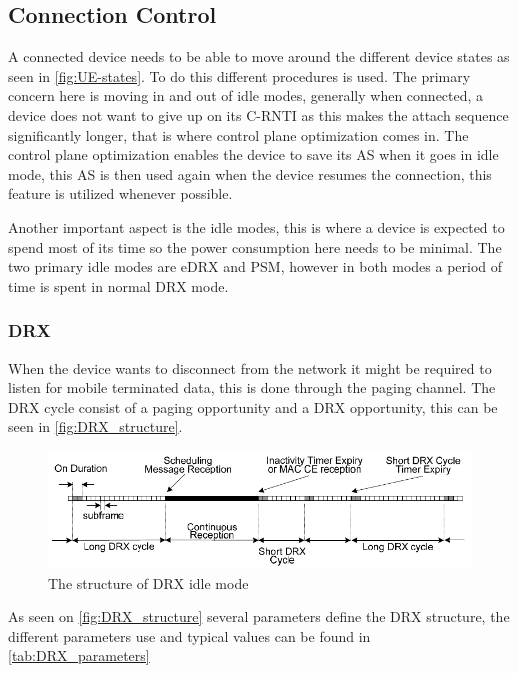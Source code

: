 \subsection{Connection Control}
A connected device needs to be able to move around the different device states as seen in \autoref{fig:UE-states}. To do this different procedures is used. The primary concern here is moving in and out of idle modes, generally when connected, a device does not want to give up on its \gls{C-RNTI} as this makes the attach sequence significantly longer, that is where control plane optimization comes in. The control plane optimization enables the device to save its \gls{AS} when it goes in idle mode, this \gls{AS} is then used again when the device resumes the connection, this feature is utilized whenever possible. 

Another important aspect is the idle modes, this is where a device is expected to spend most of its time so the power consumption here needs to be minimal. The two primary idle modes are \gls{eDRX} and \gls{PSM}, however in both modes a period of time is spent in normal DRX mode. 


\subsubsection{DRX}
When the device wants to disconnect from the network it might be required to listen for mobile terminated data, this is done through the paging channel. The DRX cycle consist of a paging opportunity and a DRX opportunity, this can be seen in \autoref{fig:DRX_structure}. 

\begin{figure}[H]
\centering
\includegraphics[width=\textwidth]{figures/DRX_structure.pdf}
\caption{The structure of \gls{DRX} idle mode \citep{book_LTE_for_UMTS2}}
\label{fig:DRX_structure}
\end{figure}

As seen on \autoref{fig:DRX_structure} several parameters define the DRX structure, the different parameters use and typical values can be found in \autoref{tab:DRX_parameters}

